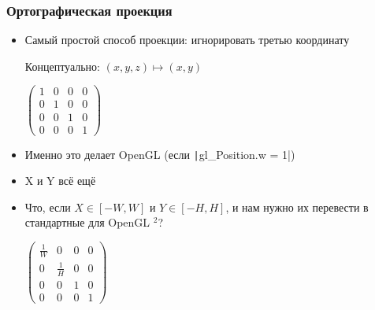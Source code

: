 \documentclass[10pt]{beamer}
\begin{document}
\begin{frame}[fragile]
\frametitle{Ортографическая проекция}
\begin{itemize}
\item Самый простой способ проекции: \pause игнорировать третью координату
\begin{center}Концептуально: \begin{math}(x, y, z) \mapsto (x, y)\end{math}\end{center}
\begin{center}
\begin{math}
\begin{pmatrix}
1 & 0 & 0 & 0 \\
0 & 1 & 0 & 0 \\
0 & 0 & 1 & 0 \\
0 & 0 & 0 & 1
\end{pmatrix}
\end{math}
\end{center}
\pause
{}
\item Именно это делает OpenGL (если \texttt|gl_Position.w = 1|)
\pause
\item X и Y всё ещё \begin{math}[-1, 1]\end{math}
\pause
\item Что, если \begin{math}X \in [-W, W]\end{math} и \begin{math}Y \in [-H, H]\end{math}, и нам нужно их перевести в стандартные для OpenGL \begin{math}[-1, 1]^2\end{math}?
\pause
\begin{center}
\begin{math}
\begin{pmatrix}
\frac{1}{W} & 0 & 0 & 0 \\
0 & \frac{1}{H} & 0 & 0 \\
0 & 0 & 1 & 0 \\
0 & 0 & 0 & 1
\end{pmatrix}
\end{math}
\end{center}
\end{itemize}
\end{frame}
\end{document}
